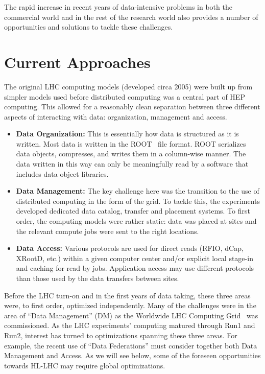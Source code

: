 \documentclass[12pt,a4paper]{article}
\begin{document}
The rapid increase in recent years of data-intensive problems in both
the commercial world and in the rest of the research world also provides
a number of opportunities and solutions to tackle these challenges.

\section{Current Approaches}\label{current-approaches}

The original LHC computing models (developed circa 2005) were built up from
simpler models used before distributed computing was a central part of
HEP computing. This allowed for a reasonably clean separation between
three different aspects of interacting with data: organization,
management and access.

\begin{itemize}
\item \textbf{Data Organization:} This is essentially how data is structured
  as it is written. Most data is written in the ROOT~\cite{Brun1996} file format. ROOT serializes data objects, compresses, and writes them in a column-wise manner. The data written in this way can only be meaningfully read by a software that includes data object libraries.
\item \textbf{Data Management:} The key challenge here was the transition to
  the use of distributed computing in the form of the grid. To tackle this, the
  experiments developed dedicated data catalog,  transfer and placement systems. To first
  order, the computing models were rather static: data was placed at
  sites and the relevant compute jobs were sent to the right locations.
\item \textbf{Data Access:} Various protocols are used for direct reads
  (RFIO, dCap, XRootD, etc.) within a given computer center and/or
  explicit local stage-in and caching for read by jobs. Application
  access may use different protocols than those used by the data
  transfers between sites.
\end{itemize}

Before the LHC turn-on and in the first years of data taking, these three
areas were, to first order, optimized independently. Many of the
challenges were in the area of ``Data Management'' (DM) as the Worldwide
LHC Computing Grid~\cite{WLCG} was commissioned. As the LHC experiments' computing matured
through Run1 and Run2, interest has turned to optimizations spanning
these three areas. For example, the recent use of ``Data Federations''
must consider together both Data Management and Access. As we will see below, some of the
foreseen opportunities towards HL-LHC may require global optimizations.
\end{document}
